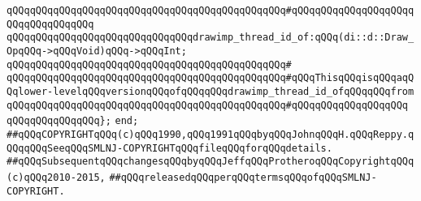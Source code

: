 \verb|qQQqqQQqqQQqqQQqqQQqqQQqqQQqqQQqqQQqqQQqqQQqqQQq#qQQqqQQqqQQqqQQqqQQq|\verb|qQQqqQQqqQQqqQQq|\newline
\newline
\verb|qQQqqQQqqQQqqQQqqQQqqQQqqQQqqQQqdrawimp_thread_id_of:qQQq(di::d::Draw_OpqQQq->qQQqVoid)qQQq->qQQqInt;|\newline
\verb|qQQqqQQqqQQqqQQqqQQqqQQqqQQqqQQqqQQqqQQqqQQqqQQq#|\newline
\verb|qQQqqQQqqQQqqQQqqQQqqQQqqQQqqQQqqQQqqQQqqQQqqQQq#qQQqThisqQQqisqQQqaqQQqlower-levelqQQqversionqQQqofqQQqqQQqdrawimp_thread_id_ofqQQqqQQqfrom|\newline
\verb|qQQqqQQqqQQqqQQqqQQqqQQqqQQqqQQqqQQqqQQqqQQqqQQq#qQQqqQQqqQQqqQQqqQQq|\newline
\verb|qQQqqQQqqQQqqQQq};|\newline
\newline
\verb|end;|\newline
\newline
\verb|##qQQqCOPYRIGHTqQQq(c)qQQq1990,qQQq1991qQQqbyqQQqJohnqQQqH.qQQqReppy.qQQqqQQqSeeqQQqSMLNJ-COPYRIGHTqQQqfileqQQqforqQQqdetails.|\newline
\verb|##qQQqSubsequentqQQqchangesqQQqbyqQQqJeffqQQqProtheroqQQqCopyrightqQQq(c)qQQq2010-2015,|\newline
\verb|##qQQqreleasedqQQqperqQQqtermsqQQqofqQQqSMLNJ-COPYRIGHT.|\newline

